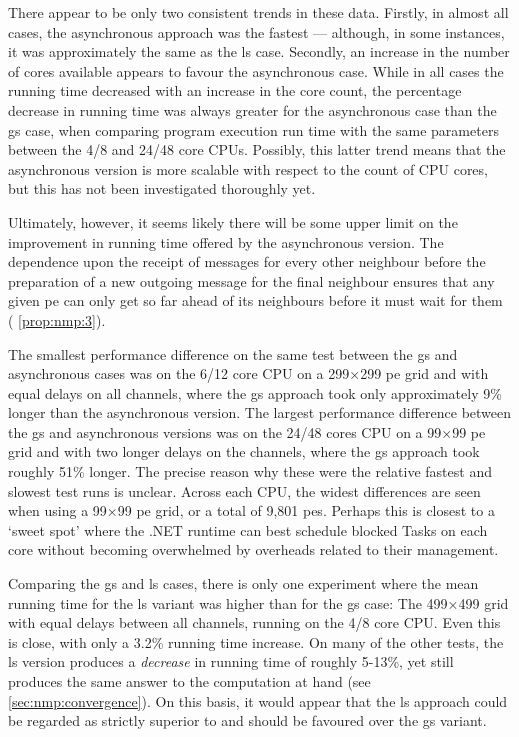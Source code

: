 There appear to be only two consistent trends in these data.  Firstly, in almost all cases, the asynchronous approach was the fastest --- although, in some instances, it was approximately the same as the \gls{ls} case.  Secondly, an increase in the number of cores available appears to favour the asynchronous case.  While in all cases the running time decreased with an increase in the core count, the percentage decrease in running time was always greater for the asynchronous case than the \gls{gs} case, when comparing program execution run time with the same parameters between the 4/8 and 24/48 core CPUs.  Possibly, this latter trend means that the asynchronous version is more scalable with respect to the count of CPU cores, but this has not been investigated thoroughly yet.

Ultimately, however, it seems likely there will be some upper limit on the improvement in running time offered by the asynchronous version.  The dependence upon the receipt of messages for every other neighbour before the preparation of a new outgoing message for the final neighbour ensures that any given \gls{pe} can only get so far ahead of its neighbours before it must wait for them (\ala{} \cref{prop:nmp:3}).

The smallest performance difference on the same test between the \gls{gs} and asynchronous cases was on the 6/12 core CPU on a 299×299 \gls{pe} grid and with equal delays on all channels, where the \gls{gs} approach took only approximately 9\% longer than the asynchronous version.  The largest performance difference between the \gls{gs} and asynchronous versions was on the 24/48 cores CPU on a 99×99 \gls{pe} grid and with two longer delays on the channels, where the \gls{gs} approach took roughly 51\% longer.  The precise reason why these were the relative fastest and slowest test runs is unclear.  Across each CPU, the widest differences are seen when using a 99×99 \gls{pe} grid, or a total of 9,801 \glspl{pe}.  Perhaps this is closest to a `sweet spot' where the .NET runtime can best schedule blocked Tasks on each core without becoming overwhelmed by overheads related to their management.

Comparing the \gls{gs} and \gls{ls} cases, there is only one experiment where the mean running time for the \gls{ls} variant was higher than for the \gls{gs} case:  The 499×499 grid with equal delays between all channels, running on the 4/8 core CPU.  Even this is close, with only a 3.2\% running time increase.   On many of the other tests, the \gls{ls} version produces a \emph{decrease} in running time of roughly 5-13\%, yet still produces the same answer to the computation at hand (see \cref{sec:nmp:convergence}).  On this basis, it would appear that the \gls{ls} approach could be regarded as strictly superior to and should be favoured over the \gls{gs} variant.


